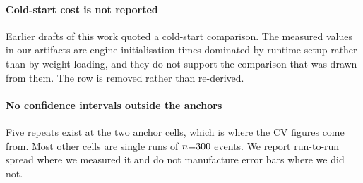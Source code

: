 \paragraph{Cold-start cost is not reported}
Earlier drafts of this work quoted a cold-start comparison. The measured
values in our artifacts are engine-initialisation times dominated by runtime
setup rather than by weight loading, and they do not support the comparison
that was drawn from them. The row is removed rather than re-derived.

\paragraph{No confidence intervals outside the anchors}
Five repeats exist at the two anchor cells, which is where the CV figures come
from. Most other cells are single runs of $n{=}300$ events. We report
run-to-run spread where we measured it and do not manufacture error bars where
we did not.
